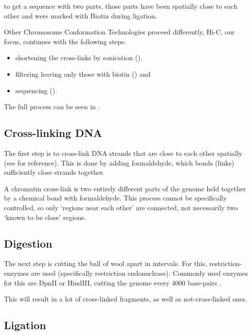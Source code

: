 to get a sequence with two parts, those parts have been spatially close
to each other and were marked with Biotin during ligation.

Other Chromosome Conformation Technologies proceed differently, Hi-C, our
focus, continues with the following steps:

\begin{itemize}
    \item shortening the cross-links by sonication (),
    \item filtering leaving only those with biotin () and
    \item sequencing ().
\end{itemize}

The full process can be seen in .

\subsection{Cross-linking DNA}\label{sec:crosslinking}

The first step is to cross-link DNA strands that are close to each other
spatially (see  for reference). This is done by adding
formaldehyde, which bonds (links) sufficiently close strands together.

A chromatin cross-link is two entirely different parts of the genome held
together by a chemical bond with formaldehyde. This process cannot be
specifically controlled, so only `regions near each other' are connected, not
necessarily two `known to be close' regions.

\subsection{Digestion}\label{sec:digestion}

The next step is cutting the ball of wool apart in intervals. For this,
restriction-enzymes are used (specifically restriction endonuclease). Commonly
used enzymes for this are DpnII or HindIII, cutting the genome every 4000 base-pairs
.

This will result in a lot of cross-linked fragments, as well as not-cross-linked ones.

\subsection{Ligation}\label{sec:ligation}

